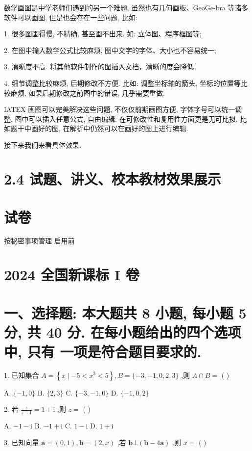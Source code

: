 \documentclass[10pt]{article}
\begin{document}
数学画图是中学老师们遇到的另一个难题, 虽然也有几何画板、GeoGe-bra 等诸多软件可以画图, 但是也会存在一些问题, 比如:

1. 很多图画得慢, 不精确, 甚至画不出来. 如: 立体图、程序框图等;

2. 在图中输入数学公式比较麻烦, 图中文字的字体、大小也不容易统一;

3. 清晰度不高. 将其他软件制作的图插入文档，清晰的度会降低.

4. 细节调整比较麻烦, 后期修改不方便. 比如: 调整坐标轴的箭头, 坐标的位置等比较麻烦, 如果后期修改之前图中的错误, 几乎需要重做.

IATEX 画图可以完美解决这些问题, 不仅仅前期画图方便, 字体字号可以统一调整, 图中可以插入任意公式, 自由编辑. 在可修改性和复用性方面更是无可比拟. 比如题干中画好的图, 在解析中仍然可以在画好的图上进行编辑.

接下来我们来看具体效果.

\section*{2.4 试题、讲义、校本教材效果展示}

\section*{试卷}

按秘密事项管理  启用前

\section*{2024 全国新课标 I 卷}

\section*{一、选择题: 本大题共 8 小题, 每小题 5 分, 共 40 分. 在每小题给出的四个选项中, 只有 一项是符合题目要求的.}

1. 已知集合 \(A = \left\{  {x \mid   - 5 < {x}^{3} < 5}\right\}  ,B = \{  - 3, - 1,0,2,3\}\) ,则 \(A \cap  B =\) ( )

A. \(\{  - 1,0\}\) B. \(\{ 2,3\}\) C. \(\{  - 3, - 1,0\}\) D. \(\{  - 1,0,2\}\)

2. 若 \(\frac{z}{z - 1} = 1 + \mathrm{i}\) ,则 \(z =\) ( )

A. \(- 1 - \mathrm{i}\) B. \(- 1 + \mathrm{i}\) C. \(1 - \mathrm{i}\) D. \(1 + \mathrm{i}\)

3. 已知向量 \(\mathbf{a} = \left( {0,1}\right) ,\mathbf{b} = \left( {2,x}\right)\) ,若 \(\mathbf{b} \bot  \left( {\mathbf{b} - 4\mathbf{a}}\right)\) ,则 \(x =\) ( )
\end{document}
